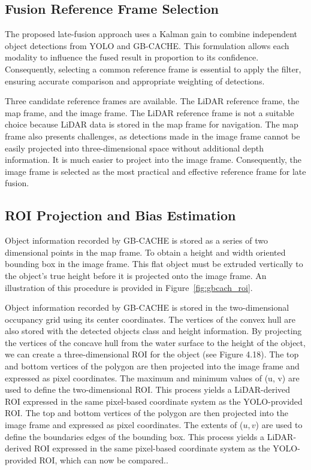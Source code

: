 \documentclass{erauthesis}
\begin{document}
\subsection{Fusion Reference Frame Selection} \label{fusion_ref_frame}
The proposed late-fusion approach uses a Kalman gain to combine independent object detections from YOLO and GB-CACHE. 
This formulation allows each modality to influence the fused result in proportion to its confidence. 
Consequently, selecting a common reference frame is essential to apply the filter, ensuring accurate comparison and appropriate weighting of detections.

Three candidate reference frames are available. The LiDAR reference frame, the map frame, and the image frame. The LiDAR reference frame is not a suitable choice because LiDAR data is stored in the map frame for navigation. 
The map frame also presents challenges, as detections made in the image frame cannot be easily projected into three-dimensional space without additional depth information.
It is much easier to project into the image frame.
Consequently, the image frame is selected as the most practical and effective reference frame for late fusion.

\subsection{ROI Projection and Bias Estimation}

Object information recorded by GB-CACHE is stored as a series of two dimensional points in the map frame. To obtain a height and width oriented bounding box in the image frame. This flat object must be extruded vertically to the object's true height before it is projected onto the image frame. An illustration of this procedure is provided in Figure~\ref{fig:gbcach_roi}.

Object information recorded by GB-CACHE is stored in the two-dimensional
occupancy grid using its center coordinates. The vertices of the convex hull are also stored
with the detected objects class and height information. By projecting the vertices of the
concave hull from the water surface to the height of the object, we can create a
three-dimensional ROI for the object (see Figure 4.18). The top and bottom vertices of the
polygon are then projected into the image frame and expressed as pixel coordinates. The
maximum and minimum values of (u, v) are used to define the two-dimensional \ac{ROI}. This process yields a LiDAR-derived ROI expressed in the same pixel-based coordinate system as the YOLO-provided ROI.
The top and bottom vertices of the polygon are then projected into the image frame and expressed as pixel coordinates. 
The extents of ($u, v$) are used to define the boundaries edges of the bounding box. 
This process yields a LiDAR-derived ROI expressed in the same pixel-based coordinate system as the YOLO-provided ROI, which can now be compared.. 
\end{document}
